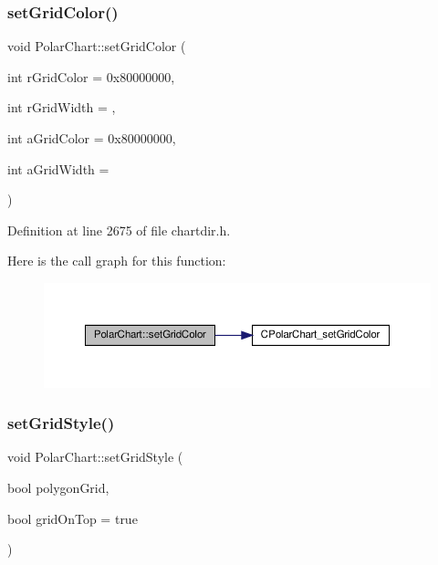 \subsubsection{\texorpdfstring{set\+Grid\+Color()}{setGridColor()}}
{\footnotesize\ttfamily void Polar\+Chart\+::set\+Grid\+Color (\begin{DoxyParamCaption}\item[{int}]{r\+Grid\+Color = {\ttfamily 0x80000000},  }\item[{int}]{r\+Grid\+Width = {},  }\item[{int}]{a\+Grid\+Color = {\ttfamily 0x80000000},  }\item[{int}]{a\+Grid\+Width = {} }\end{DoxyParamCaption})\hspace{0.3cm}{\ttfamily [inline]}}



Definition at line 2675 of file chartdir.\+h.

Here is the call graph for this function\+:
\nopagebreak
\begin{figure}[H]
\begin{center}
\leavevmode
\includegraphics[width=350pt]{class_polar_chart_a781271d5381dfe4fe6164384ebbed7a1_cgraph}
\end{center}
\end{figure}
\mbox{\label{class_polar_chart_a088600a8966e89904181d33842077e15}} 
\subsubsection{\texorpdfstring{set\+Grid\+Style()}{setGridStyle()}}
{\footnotesize\ttfamily void Polar\+Chart\+::set\+Grid\+Style (\begin{DoxyParamCaption}\item[{bool}]{polygon\+Grid,  }\item[{bool}]{grid\+On\+Top = {\ttfamily true} }\end{DoxyParamCaption})\hspace{0.3cm}{\ttfamily [inline]}}



